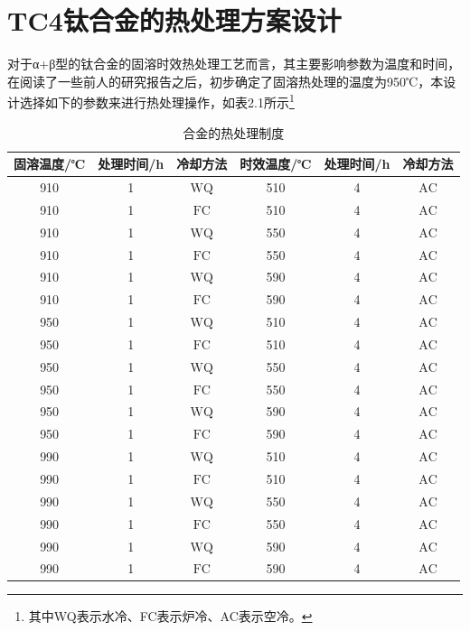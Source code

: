 
\section{TC4钛合金的热处理方案设计}
对于α+β型的\ti 钛合金的固溶时效热处理工艺而言，其主要影响参数为温度和时间，在阅读了一些前人的研究报告\cite{mirror1}\cite{mirror2}之后，初步确定了固溶热处理的温度为950℃，本设计选择如下的参数来进行热处理操作，如表2.1所示\footnote{其中WQ表示水冷、FC表示炉冷、AC表示空冷。}
\begin{table}[htbp]
	\centering
	\label{sec:myHT}
	\caption{\ti 合金的热处理制度}
\begin{tabular}{cccccc}
	\toprule
		固溶温度/℃ &处理时间/h & 冷却方法 & 时效温度/℃  &处理时间/h & 冷却方法 \\
	\midrule
	910 & 1 & $\mathrm{WQ}$ & 510 & 4 & $\mathrm{AC}$\\
	910 & 1 & $\mathrm{FC}$  & 510 & 4 & $\mathrm{AC}$ \\
	910 & 1 & $\mathrm{WQ}$ & 550 & 4 & $\mathrm{AC}$ \\
	910 & 1 & $\mathrm{FC}$  & 550 & 4 & $\mathrm{AC}$ \\
	910 & 1 & $\mathrm{WQ}$ & 590 & 4 & $\mathrm{AC}$ \\
	910 & 1 & $\mathrm{FC}$  & 590 & 4 & $\mathrm{AC}$ \\
	\midrule
	950 & 1 & $\mathrm{WQ}$ & 510 & 4 & $\mathrm{AC}$ \\
	950 & 1 & $\mathrm{FC}$ & 510 & 4 & $\mathrm{AC}$ \\
	950 & 1 & $\mathrm{WQ}$ & 550 & 4 & $\mathrm{AC}$ \\
	950 & 1 & $\mathrm{FC}$ & 550 & 4 & $\mathrm{AC}$ \\
	950 & 1 & $\mathrm{WQ}$ & 590 & 4 & $\mathrm{AC}$ \\
	950 & 1 & $\mathrm{FC}$ & 590 & 4 & $\mathrm{AC}$ \\
	\midrule
	990 & 1 & $\mathrm{WQ}$ & 510 & 4 & $\mathrm{AC}$ \\
	990 & 1 & $\mathrm{FC}$ & 510 & 4 & $\mathrm{AC}$ \\
	990 & 1 & $\mathrm{WQ}$ & 550 & 4 & $\mathrm{AC}$ \\
	990 & 1 & $\mathrm{FC}$ & 550 & 4 & $\mathrm{AC}$ \\
	990 & 1 & $\mathrm{WQ}$ & 590 & 4 & $\mathrm{AC}$ \\
	990 & 1 & $\mathrm{FC}$ & 590 & 4 & $\mathrm{AC}$ \\
	\bottomrule
\end{tabular}
\end{table}
